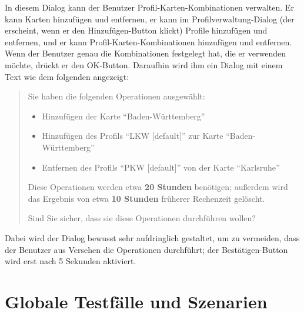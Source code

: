 \documentclass[a4paper, 11pt]{article}
\begin{document}
In diesem Dialog kann der Benutzer Profil-Karten-Kombinationen verwalten. Er kann Karten hinzufügen und entfernen, er kann im Profilverwaltung-Dialog (der erscheint, wenn er den Hinzufügen-Button klickt) Profile hinzufügen und entfernen, und er kann Profil-Karten-Kombinationen hinzufügen und entfernen. Wenn der Benutzer genau die Kombinationen festgelegt hat, die er verwenden möchte, drückt er den OK-Button. Daraufhin wird ihm ein Dialog mit einem Text wie dem folgenden angezeigt:
\begin{quote}
  Sie haben die folgenden Operationen ausgewählt:
  \begin{itemize}
  \item Hinzufügen der Karte ``Baden-Württemberg''
  \item Hinzufügen des Profils ``LKW [default]'' zur Karte ``Baden-Württemberg''
  \item Entfernen des Profils ``PKW [default]'' von der Karte ``Karlsruhe''
  \end{itemize}
  Diese Operationen werden etwa \textbf{20 Stunden} benötigen; außerdem wird das Ergebnis von etwa \textbf{10 Stunden} früherer Rechenzeit gelöscht.
  
  Sind Sie sicher, dass sie diese Operationen durchführen wollen?
\end{quote}
Dabei wird der Dialog bewusst sehr aufdringlich gestaltet, um zu vermeiden, dass der Benutzer aus Versehen die Operationen durchführt; der Bestätigen-Button wird erst nach 5 Sekunden aktiviert.

\section{Globale Testfälle und Szenarien}
\end{document}
